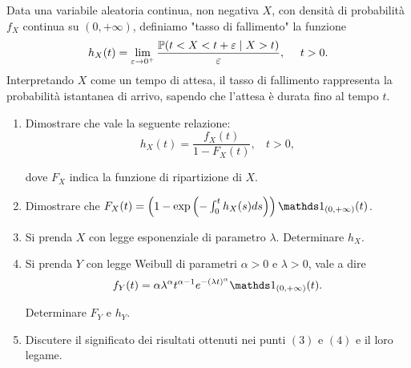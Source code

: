 Data una variabile aleatoria continua, non negativa $X$, con densità di probabilità $f_{X}$ continua su $\left( 0,+\infty \right)$, definiamo "tasso di fallimento" la funzione
\begin{equation*}
h_{X}( t) =\lim _{\varepsilon \rightarrow 0^{+}}\frac{\mathbb{P}( t< X< t+\varepsilon \mid X >t)}{\varepsilon } ,\ \ \ \ t >0.
\end{equation*}
Interpretando $X$ come un tempo di attesa, il tasso di fallimento rappresenta la probabilità istantanea di arrivo, sapendo che l'attesa è durata fino al tempo $t$.
\begin{enumerate}
\item Dimostrare che vale la seguente relazione:\begin{equation*}
h_{X}( t) =\frac{f_{X}( t)}{1-F_{X}( t)} ,\ \ \ \ t >0,
\end{equation*}

dove $F_{X}$ indica la funzione di ripartizione di $X$.
\item Dimostrare che $F_{X}( t) =\left( 1-\exp\left( -\int _{0}^{t} h_{X}( s) ds\right)\right) \Ind_{( 0,+\infty )}( t)$.
\item Si prenda $X$ con legge esponenziale di parametro $\lambda $. Determinare $h_{X}$.
\item Si prenda $Y$ con legge Weibull di parametri $\alpha  >0$ e $\lambda  >0$, vale a dire
\begin{equation*}
f_{Y}( t) =\alpha \lambda ^{\alpha } t^{\alpha -1} e^{-( \lambda t)^{\alpha }} \Ind_{( 0,+\infty )}( t) .
\end{equation*}

Determinare $F_{Y}$ e $h_{Y}$.
\item Discutere il significato dei risultati ottenuti nei punti $( 3)$ e $( 4)$ e il loro legame.
\end{enumerate}
\Esercizio{}

